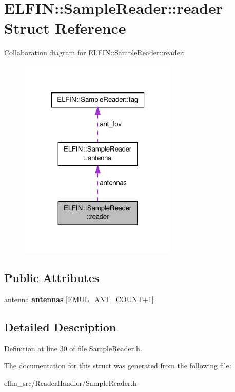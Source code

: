 \hypertarget{struct_e_l_f_i_n_1_1_sample_reader_1_1reader}{\section{E\-L\-F\-I\-N\-:\-:Sample\-Reader\-:\-:reader Struct Reference}
\label{struct_e_l_f_i_n_1_1_sample_reader_1_1reader}
}


Collaboration diagram for E\-L\-F\-I\-N\-:\-:Sample\-Reader\-:\-:reader\-:
\nopagebreak
\begin{figure}[H]
\begin{center}
\leavevmode
\includegraphics[width=214pt]{struct_e_l_f_i_n_1_1_sample_reader_1_1reader__coll__graph}
\end{center}
\end{figure}
\subsection*{Public Attributes}
\begin{DoxyCompactItemize}
\item 
\hypertarget{struct_e_l_f_i_n_1_1_sample_reader_1_1reader_a77fe9f24ac253d4a711dfc9f79042173}{\hyperlink{struct_e_l_f_i_n_1_1_sample_reader_1_1antenna}{antenna} {\bfseries antennas} \mbox{[}E\-M\-U\-L\-\_\-\-A\-N\-T\-\_\-\-C\-O\-U\-N\-T+1\mbox{]}}\label{struct_e_l_f_i_n_1_1_sample_reader_1_1reader_a77fe9f24ac253d4a711dfc9f79042173}

\end{DoxyCompactItemize}


\subsection{Detailed Description}


Definition at line 30 of file Sample\-Reader.\-h.



The documentation for this struct was generated from the following file\-:\begin{DoxyCompactItemize}
\item 
elfin\-\_\-src/\-Reader\-Handler/Sample\-Reader.\-h\end{DoxyCompactItemize}
